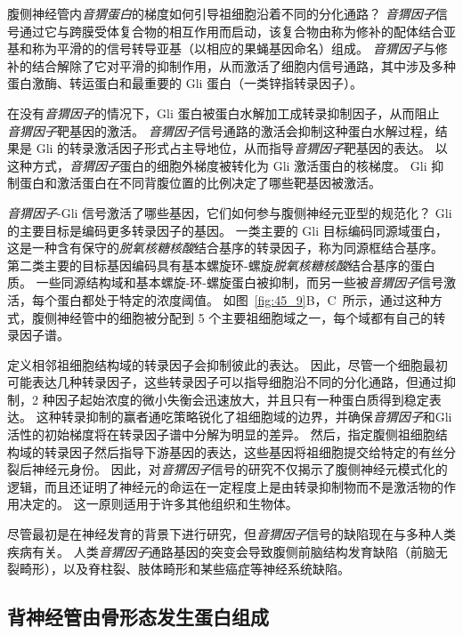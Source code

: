 腹侧神经管内\textit{音猬蛋白}的梯度如何引导祖细胞沿着不同的分化通路？
\textit{音猬因子}信号通过它与跨膜受体复合物的相互作用而启动，该复合物由称为修补的配体结合亚基和称为平滑的的信号转导亚基（以相应的果蝇基因命名）组成。
\textit{音猬因子}与修补的结合解除了它对平滑的抑制作用，从而激活了细胞内信号通路，其中涉及多种蛋白激酶、转运蛋白和最重要的 Gli 蛋白（一类锌指转录因子）。


在没有\textit{音猬因子}的情况下，Gli 蛋白被蛋白水解加工成转录抑制因子，从而阻止 \textit{音猬因子}靶基因的激活。
\textit{音猬因子}信号通路的激活会抑制这种蛋白水解过程，结果是 Gli 的转录激活因子形式占主导地位，从而指导\textit{音猬因子}靶基因的表达。
以这种方式，\textit{音猬因子}蛋白的细胞外梯度被转化为 Gli 激活蛋白的核梯度。
Gli 抑制蛋白和激活蛋白在不同背腹位置的比例决定了哪些靶基因被激活。


\textit{音猬因子}-Gli 信号激活了哪些基因，它们如何参与腹侧神经元亚型的规范化？
Gli 的主要目标是编码更多转录因子的基因。
一类主要的 Gli 目标编码同源域蛋白，这是一种含有保守的\textit{脱氧核糖核酸}结合基序的转录因子，称为同源框结合基序。
第二类主要的目标基因编码具有基本螺旋环-螺旋\textit{脱氧核糖核酸}结合基序的蛋白质。
一些同源结构域和基本螺旋-环-螺旋蛋白被抑制，而另一些被\textit{音猬因子}信号激活，每个蛋白都处于特定的浓度阈值。
如图~\ref{fig:45_9}B，C~所示，通过这种方式，腹侧神经管中的细胞被分配到 5 个主要祖细胞域之一，每个域都有自己的转录因子谱。


定义相邻祖细胞结构域的转录因子会抑制彼此的表达。
因此，尽管一个细胞最初可能表达几种转录因子，这些转录因子可以指导细胞沿不同的分化通路，但通过抑制，2 种因子起始浓度的微小失衡会迅速放大，并且只有一种蛋白质得到稳定表达。
这种转录抑制的赢者通吃策略锐化了祖细胞域的边界，并确保\textit{音猬因子}和Gli活性的初始梯度将在转录因子谱中分解为明显的差异。
然后，指定腹侧祖细胞结构域的转录因子然后指导下游基因的表达，这些基因将祖细胞提交给特定的有丝分裂后神经元身份。
因此，对\textit{音猬因子}信号的研究不仅揭示了腹侧神经元模式化的逻辑，而且还证明了神经元的命运在一定程度上是由转录抑制物而不是激活物的作用决定的。
这一原则适用于许多其他组织和生物体。


尽管最初是在神经发育的背景下进行研究，但\textit{音猬因子}信号的缺陷现在与多种人类疾病有关。
人类\textit{音猬因子}通路基因的突变会导致腹侧前脑结构发育缺陷（前脑无裂畸形），以及脊柱裂、肢体畸形和某些癌症等神经系统缺陷。



\subsection{背神经管由骨形态发生蛋白组成}

